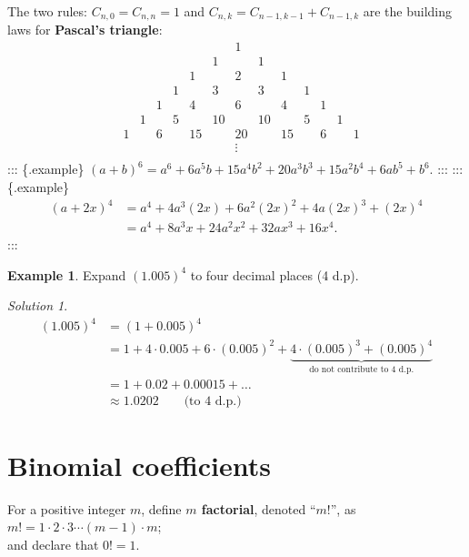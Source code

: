 \documentclass[
  12pt,
  oneside]{book}
\theoremstyle{definition}
\theoremstyle{definition}
\newtheorem{example}{Example}[chapter]
\theoremstyle{definition}
\theoremstyle{definition}
\theoremstyle{remark}
\newtheorem*{solution}{Solution}
\begin{document}
The two rules: \(C_{n,0}=C_{n,n}=1\) and \(C_{n,k}=C_{n-1,k-1}+C_{n-1,k}\) are the building laws for \textbf{Pascal's triangle}:
\[
\begin{array}{cccccccccccccc}
    &  &  &  &  &  &  &1 &  &  &  &  &  &   \\
    &  &  &  &  &  &1 &  &1 &  &  &  &  &   \\
    &  &  &  &  &1 &  &2 &  &1 &  &  &  &   \\
    &  &  &  &1 &  &3 &  &3 &  &1 &  &  &   \\
    &  &  &1 &  &4 &  &6 &  &4 &  &1 &  &   \\
    &  &1 &  &5 &  &10&  &10&  &5 &  &1 &   \\
    &1 &  &6 &  &15&  &20&  &15&  &6 &  &1  \\
    &  &  &  &  &  &  &\vdots&  &  &  &  &  &   \\
\end{array}
\]
::: \{.example\}
\((a+b)^6 = a^6 + 6 a^5b + 15 a^4b^2 + 20 a^3b^3 + 15 a^2b^4 + 6 ab^5 + b^6\).
:::
::: \{.example\}
\begin{align*}(a+2x)^4 &= a^4 + 4a^3(2x) + 6a^2(2x)^2 + 4a(2x)^3+(2x)^4\\
&= a^4 +8a^3x+24a^2x^2+32ax^3+16x^4.
\end{align*}
:::

\begin{example}
Expand \((1.005)^4\) to four decimal places (4 d.p).
\end{example}

\begin{solution}
\begin{align*}
(1.005)^4 &= (1+0.005)^4\\
&= 1+ 4\cdot 0.005 + 6\cdot (0.005)^2 + \underbrace{4\cdot(0.005)^3 + (0.005)^4}_{\text{do not contribute to 4 d.p.}}\\
&= 1+0.02 + 0.00015 + \dots \\
&\approx 1.0202\quad\quad\text{(to 4 d.p.)}
\end{align*}
\end{solution}

\section{Binomial coefficients}\label{binomial-coefficients}

For a positive integer \(m\), define \textbf{\(m\) factorial}, denoted ``\(m!\)'', as
\(m!=1\cdot2\cdot 3\cdots (m-1)\cdot m\);\\
and declare that \(0!=1\).
\end{document}
